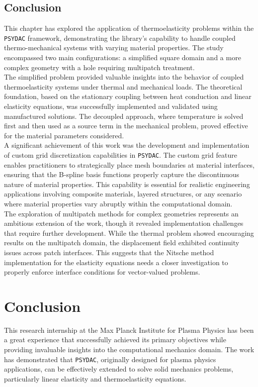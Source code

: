 \documentclass[a4paper,12pt,twoside]{report}
\begin{document}
\section{Conclusion}

This chapter has explored the application of thermoelasticity problems within the \texttt{PSYDAC} framework, demonstrating the library's capability to handle coupled thermo-mechanical systems with varying material properties. The study encompassed two main configurations: a simplified square domain and a more complex geometry with a hole requiring multipatch treatment. \\

The simplified problem provided valuable insights into the behavior of coupled thermoelasticity systems under thermal and mechanical loads. The theoretical foundation, based on the stationary coupling between heat conduction and linear elasticity equations, was successfully implemented and validated using manufactured solutions. The decoupled approach, where temperature is solved first and then used as a source term in the mechanical problem, proved effective for the material parameters considered. \\

A significant achievement of this work was the development and implementation of custom grid discretization capabilities in \texttt{PSYDAC}. The custom grid feature enables practitioners to strategically place mesh boundaries at material interfaces, ensuring that the B-spline basis functions properly capture the discontinuous nature of material properties. This capability is essential for realistic engineering applications involving composite materials, layered structures, or any scenario where material properties vary abruptly within the computational domain. \\

The exploration of multipatch methods for complex geometries represents an ambitious extension of the work, though it revealed implementation challenges that require further development. While the thermal problem showed encouraging results on the multipatch domain, the displacement field exhibited continuity issues across patch interfaces. This suggests that the Nitsche method implementation for the elasticity equations needs a closer investigation to properly enforce interface conditions for vector-valued problems. \\

\chapter{Conclusion}
This research internship at the Max Planck Institute for Plasma Physics has been a great experience that successfully achieved its primary objectives while providing invaluable insights into the computational mechanics domain. The work has demonstrated that \texttt{PSYDAC}, originally designed for plasma physics applications, can be effectively extended to solve solid mechanics problems, particularly linear elasticity and thermoelasticity equations.
\end{document}

